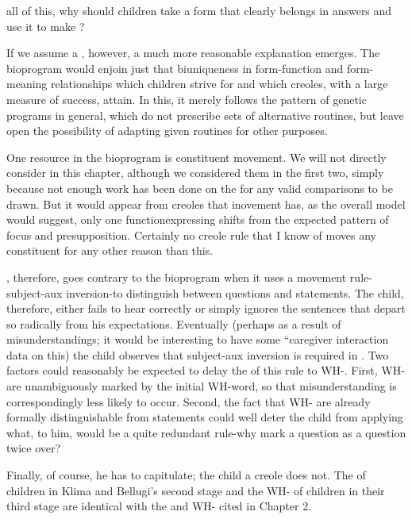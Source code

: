 all of this, why should children take a form that clearly belongs in answers and use it to make ?

If we assume a , however, a much more reasonable explanation emerges. The bioprogram would enjoin just that biuniqueness in form-function and form-meaning relationships which children strive for and which creoles, with a large measure of success, attain. In this, it merely follows the pattern of genetic programs in general, which do not prescribe sets of alternative routines, but leave open the possibility of adapting given routines for other purposes.

One resource in the bioprogram is constituent movement. We will not directly consider  in this chapter, although we considered them in the first two, simply because not enough work has been done on the   for any valid comparisons to be drawn. But it would appear from creoles that inove\-ment has, as the overall model would suggest, only one function\-expressing shifts from the expected pattern of focus and presupposi\-tion. Certainly no creole rule that I know of moves any constituent for any other reason than this.

, therefore, goes contrary to the bioprogram when it uses a movement rule-subject-aux inversion-to distinguish between ques\-tions and statements. The child, therefore, either fails to hear correctly or simply ignores the sentences that depart so radically from his expec\-tations. Eventually (perhaps as a result of misunderstandings; it would be interesting to have some ``caregiver interaction data on this) the child observes that subject-aux inversion is required in  . Two factors could reasonably be expected to delay the  of this rule to WH-. First, WH- are unambiguously marked by the initial WH-word, so that misunderstanding is corre\-spondingly less likely to occur. Second, the fact that WH- are already formally distinguishable from statements could well deter the child from applying what, to him, would be a quite redundant rule-why mark a question as a question twice over?

Finally, of course, he has to capitulate; the child  a creole does not. The   of children in Klima and Bellugi's 
second stage and the WH- of children in their third stage are identical with the  and WH- cited in Chapter 2.

